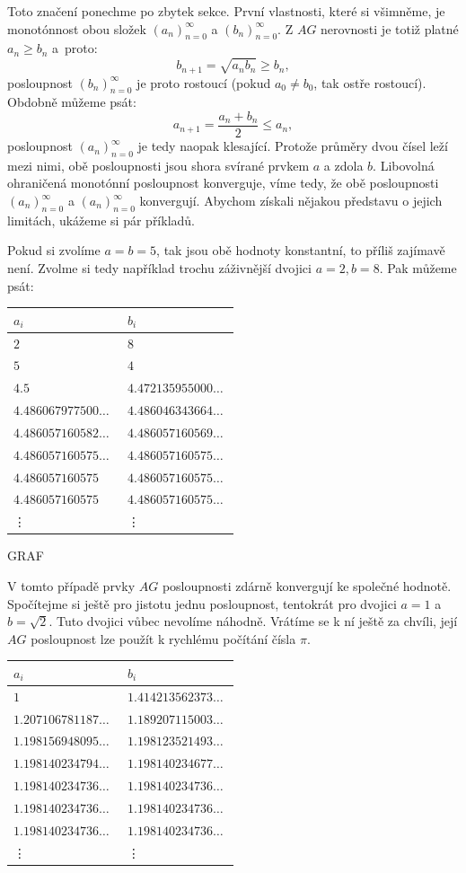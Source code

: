 \documentclass[12pt]{report}
\begin{document}
Toto značení ponechme po zbytek sekce. První vlastnosti, které si všimněme, je monotónnost obou složek $(a_n)_{n=0}^{\infty}$ a $(b_n)_{n=0}^{\infty}$. Z $AG$ nerovnosti je totiž platné $a_n \geqslant b_n$ a~proto:
$$ b_{n+1} = \sqrt{a_n b_n} \geqslant b_n,$$
posloupnost $(b_n)_{n=0}^{\infty}$ je proto rostoucí (pokud $a_0 \neq b_0$, tak ostře rostoucí). Obdobně  můžeme psát:
$$a_{n+1} = \frac{a_n+b_n}{2} \leqslant a_n,$$
posloupnost $(a_n)_{n=0}^{\infty}$ je tedy naopak klesající. Protože průměry dvou čísel leží mezi nimi, obě posloupnosti jsou shora svírané prvkem $a$ a zdola $b$. Libovolná ohraničená monotónní posloupnost konverguje, víme tedy, že obě posloupnosti $(a_n)_{n=0}^{\infty}$ a $(a_n)_{n=0}^{\infty}$ konvergují. Abychom získali nějakou představu o jejich limitách, ukážeme si pár příkladů.


Pokud si zvolíme $a=b=5$, tak jsou obě hodnoty konstantní, to příliš zajímavě není. Zvolme si tedy například trochu záživnější dvojici $a = 2, b = 8$. Pak můžeme psát:


\begin{longtable}[H]{>{\raggedright\arraybackslash}p{0.3\linewidth}p{0.202\linewidth}}
\toprule
$a_i$ & $b_i$\\
\midrule
$2$ & \noindent $8$\\
$5$ & \noindent $4$\\
$ 4.5$ & $4.472135955000\dots$\\
$4.486067977500\dots$ & $4.486046343664\dots$\\
$4.486057160582\dots$ & $4.486057160569\dots$\\ 
$4.486057160575\dots$ & $4.486057160575\dots$\\
$4.486057160575$ & $4.486057160575\dots$\\
$4.486057160575$ & $4.486057160575\dots$\\
\vdots & \vdots\\
\bottomrule 
\end{longtable}
GRAF

V tomto případě prvky $AG$ posloupnosti zdárně konvergují ke společné hodnotě. Spočítejme si ještě pro jistotu jednu posloupnost, tentokrát pro dvojici $a=1$ a $b=\sqrt{2}$. Tuto dvojici vůbec nevolíme náhodně. Vrátíme se k ní ještě za chvíli, její $AG$ posloupnost lze použít k rychlému počítání čísla $\pi$.

\begin{longtable}[H]{>{\raggedright\arraybackslash}p{0.3\linewidth}p{0.202\linewidth}}
\toprule
$a_i$ & $b_i$\\
\midrule
$1$ & $1.414213562373\dots$\\
$1.207106781187\dots$ & $1.189207115003\dots$\\
$1.198156948095\dots$ & $1.198123521493\dots$\\
$1.198140234794\dots$ & $1.198140234677\dots$\\
$1.198140234736\dots$ & $1.198140234736\dots$\\
$1.198140234736\dots$&  $1.198140234736\dots$\\
$1.198140234736\dots$&  $1.198140234736\dots$\\
\vdots & \vdots\\
\bottomrule 
\end{longtable}
\end{document}
